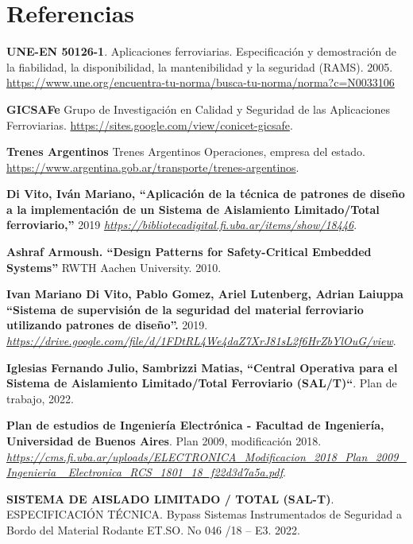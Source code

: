 
\section{Referencias}


 \begin{thebibliography}{30}

\textbf{UNE-EN 50126-1}. Aplicaciones ferroviarias. Especificación y demostración de la fiabilidad, la disponibilidad, la mantenibilidad y la seguridad (RAMS). 2005. \href{https://www.une.org/encuentra-tu-norma/busca-tu-norma/norma?c=N0033106}{https://www.une.org/encuentra-tu-norma/busca-tu-norma/norma?c=N0033106}

 \textbf{GICSAFe} Grupo de Investigación en Calidad y Seguridad de las Aplicaciones Ferroviarias. \href{https://sites.google.com/view/conicet-gicsafe}{https://sites.google.com/view/conicet-gicsafe}.


 \textbf{Trenes Argentinos} Trenes Argentinos Operaciones, empresa del estado. \href{https://www.argentina.gob.ar/transporte/trenes-argentinos}{https://www.argentina.gob.ar/transporte/trenes-argentinos}.

 \textbf{Di Vito, Iván Mariano, “Aplicación de la técnica de patrones de diseño a la implementación de un Sistema de Aislamiento Limitado/Total ferroviario,”} 2019 \href{https://bibliotecadigital.fi.uba.ar/items/show/18446}{\textit{https://bibliotecadigital.fi.uba.ar/items/show/18446}}.

 \textbf{Ashraf Armoush. “Design Patterns for Safety-Critical Embedded Systems”} RWTH Aachen University. 2010.

 \textbf{Ivan Mariano Di Vito, Pablo Gomez, Ariel Lutenberg, Adrian Laiuppa “Sistema de supervisión de la seguridad del material ferroviario utilizando patrones de diseño”.} 2019. \href{https://drive.google.com/file/d/1FDtRL4We4daZ7XrJ81sL2f6HrZbYlOuG/view}{\textit{https://drive.google.com/file/d/1FDtRL4We4daZ7XrJ81sL2f6HrZbYlOuG/view}}. 

 
 \textbf{Iglesias Fernando Julio, Sambrizzi Matias,  “Central Operativa para el Sistema de Aislamiento Limitado/Total Ferroviario (SAL/T)“}. Plan de trabajo, 2022. 

 \textbf{Plan de estudios de Ingeniería Electrónica - Facultad de Ingeniería, Universidad de Buenos Aires}. Plan 2009, modificación 2018. \href{https://cms.fi.uba.ar/uploads/ELECTRONICA_Modificacion_2018_Plan_2009_Ingenieria_Electronica_RCS_1801_18_f22d3d7a5a.pdf}{\textit{https://cms.fi.uba.ar/uploads/ELECTRONICA\_Modificacion\_2018\_Plan\_2009\_Ingenieria\_ Electronica\_RCS\_1801\_18\_f22d3d7a5a.pdf}}. 


 \textbf{SISTEMA DE AISLADO LIMITADO / TOTAL (SAL-T)}. ESPECIFICACIÓN TÉCNICA. Bypass Sistemas Instrumentados de Seguridad a Bordo del Material Rodante ET.SO. No 046 /18 – E3. 2022.


 \end{thebibliography}